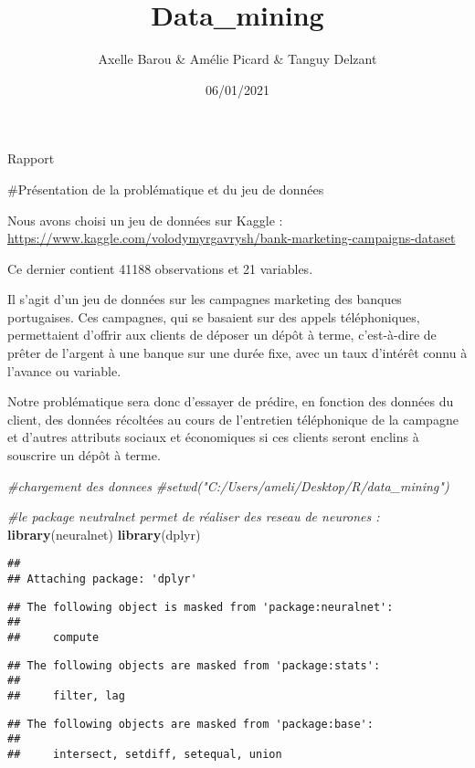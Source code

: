 \documentclass[
]{article}
\title{Data\_mining}
\author{Axelle Barou \& Amélie Picard \& Tanguy Delzant}
\date{06/01/2021}
\newenvironment{Shaded}{\begin{snugshade}}{\end{snugshade}}
\newcommand{\CommentTok}[1]{\textcolor[rgb]{0.56,0.35,0.01}{\textit{#1}}}
\newcommand{\KeywordTok}[1]{\textcolor[rgb]{0.13,0.29,0.53}{\textbf{#1}}}
\newcommand{\NormalTok}[1]{#1}
\begin{document}
\maketitle

Rapport

\#Présentation de la problématique et du jeu de données

Nous avons choisi un jeu de données sur Kaggle :
\url{https://www.kaggle.com/volodymyrgavrysh/bank-marketing-campaigns-dataset}

Ce dernier contient 41188 observations et 21 variables.

Il s'agit d'un jeu de données sur les campagnes marketing des banques
portugaises. Ces campagnes, qui se basaient sur des appels
téléphoniques, permettaient d'offrir aux clients de déposer un dépôt à
terme, c'est-à-dire de prêter de l'argent à une banque sur une durée
fixe, avec un taux d'intérêt connu à l'avance ou variable.

Notre problématique sera donc d'essayer de prédire, en fonction des
données du client, des données récoltées au cours de l'entretien
téléphonique de la campagne et d'autres attributs sociaux et économiques
si ces clients seront enclins à souscrire un dépôt à terme.

\begin{Shaded}
\begin{Highlighting}[]
\CommentTok{#chargement des donnees}
\CommentTok{#setwd("C:/Users/ameli/Desktop/R/data_mining")}

\CommentTok{#le package neutralnet permet de réaliser des reseau de neurones :}
\KeywordTok{library}\NormalTok{(neuralnet) }
\KeywordTok{library}\NormalTok{(dplyr)}
\end{Highlighting}
\end{Shaded}

\begin{verbatim}
## 
## Attaching package: 'dplyr'
\end{verbatim}

\begin{verbatim}
## The following object is masked from 'package:neuralnet':
## 
##     compute
\end{verbatim}

\begin{verbatim}
## The following objects are masked from 'package:stats':
## 
##     filter, lag
\end{verbatim}

\begin{verbatim}
## The following objects are masked from 'package:base':
## 
##     intersect, setdiff, setequal, union
\end{verbatim}
\end{document}
